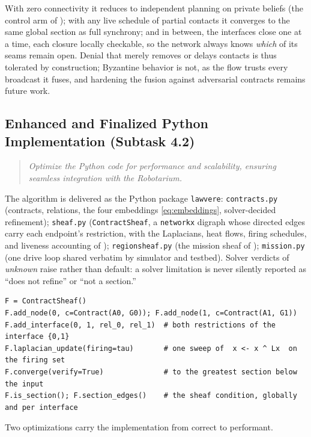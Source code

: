\documentclass[10pt]{article}
\theoremstyle{definition}
\theoremstyle{remark}
\newcommand{\prompt}[1]{%
    \begin{quote}
        \centering\itshape #1
    \end{quote}%
}
\begin{document}
With zero connectivity it reduces to independent planning on private beliefs (the control arm of ); with any live schedule of partial contacts it converges to the same global section as full synchrony; and in between, the interfaces close one at a time, each closure locally checkable, so the network always knows \emph{which} of its seams remain open. Denial that merely removes or delays contacts is thus tolerated by construction; Byzantine behavior is not, as the flow trusts every broadcast it fuses, and hardening the fusion against adversarial contracts remains future work.

\subsection{Enhanced and Finalized Python Implementation (Subtask 4.2)}
\label{sec:task42}

\prompt{Optimize the Python code for performance and scalability, ensuring seamless integration with the Robotarium.}

The algorithm is delivered as the Python package \texttt{lawvere}: \texttt{contracts.py} (contracts, relations, the four embeddings \eqref{eq:embeddings}, solver-decided refinement); \texttt{sheaf.py} (\texttt{ContractSheaf}, a \texttt{networkx} digraph whose directed edges carry each endpoint's restriction, with the Laplacians, heat flows, firing schedules, and liveness accounting of ); \texttt{regionsheaf.py} (the mission sheaf of ); \texttt{mission.py} (one drive loop shared verbatim by simulator and testbed). Solver verdicts of \emph{unknown} raise rather than default: a solver limitation is never silently reported as ``does not refine'' or ``not a section.''

\begin{lstlisting}
F = ContractSheaf()
F.add_node(0, c=Contract(A0, G0)); F.add_node(1, c=Contract(A1, G1))
F.add_interface(0, 1, rel_0, rel_1)  # both restrictions of the interface {0,1}
F.laplacian_update(firing=tau)       # one sweep of  x <- x ^ Lx  on the firing set
F.converge(verify=True)              # to the greatest section below the input
F.is_section(); F.section_edges()    # the sheaf condition, globally and per interface
\end{lstlisting}

Two optimizations carry the implementation from correct to performant. 
\end{document}
